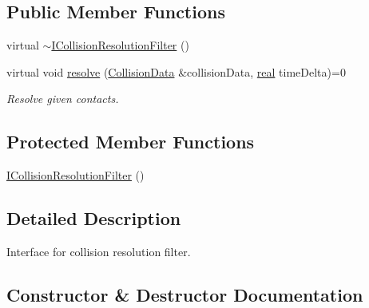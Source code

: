 \subsection*{Public Member Functions}
\begin{DoxyCompactItemize}
\item 
virtual \mbox{\hyperlink{classr3_1_1_i_collision_resolution_filter_a89b3382d573308a790d436b9713b02ed}{$\sim$\+I\+Collision\+Resolution\+Filter}} ()
\item 
virtual void \mbox{\hyperlink{classr3_1_1_i_collision_resolution_filter_a87ef2579e2acaaadef4cd8f9a20005ce}{resolve}} (\mbox{\hyperlink{classr3_1_1_collision_data}{Collision\+Data}} \&collision\+Data, \mbox{\hyperlink{namespacer3_ab2016b3e3f743fb735afce242f0dc1eb}{real}} time\+Delta)=0
\begin{DoxyCompactList}\small\item\em Resolve given contacts. \end{DoxyCompactList}\end{DoxyCompactItemize}
\subsection*{Protected Member Functions}
\begin{DoxyCompactItemize}
\item 
\mbox{\hyperlink{classr3_1_1_i_collision_resolution_filter_ab2dcf60620e28db288abf19bdeeb11ad}{I\+Collision\+Resolution\+Filter}} ()
\end{DoxyCompactItemize}


\subsection{Detailed Description}
Interface for collision resolution filter. 

\subsection{Constructor \& Destructor Documentation}
\mbox{\label{classr3_1_1_i_collision_resolution_filter_a89b3382d573308a790d436b9713b02ed}} 
